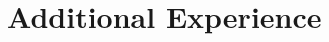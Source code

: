 \documentclass[11pt,a4paper]{moderncv}
\begin{document}
\section{Additional Experience}


%
%
%
%        
\end{document}

